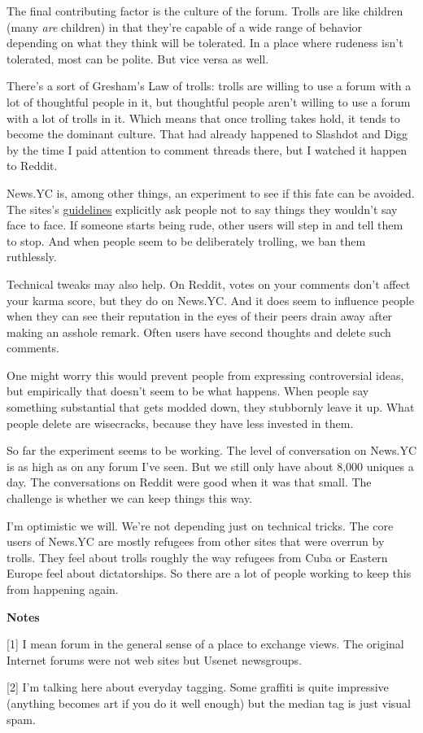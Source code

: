 The final contributing factor is the culture of the forum. Trolls are
like children (many \emph{are} children) in that they're capable of a
wide range of behavior depending on what they think will be tolerated.
In a place where rudeness isn't tolerated, most can be polite. But vice
versa as well.

There's a sort of Gresham's Law of trolls: trolls are willing to use a
forum with a lot of thoughtful people in it, but thoughtful people
aren't willing to use a forum with a lot of trolls in it. Which means
that once trolling takes hold, it tends to become the dominant culture.
That had already happened to Slashdot and Digg by the time I paid
attention to comment threads there, but I watched it happen to Reddit.

News.YC is, among other things, an experiment to see if this fate can be
avoided. The sites's
\href{http://ycombinator.com/newsguidelines.html}{guidelines} explicitly
ask people not to say things they wouldn't say face to face. If someone
starts being rude, other users will step in and tell them to stop. And
when people seem to be deliberately trolling, we ban them ruthlessly.

Technical tweaks may also help. On Reddit, votes on your comments don't
affect your karma score, but they do on News.YC. And it does seem to
influence people when they can see their reputation in the eyes of their
peers drain away after making an asshole remark. Often users have second
thoughts and delete such comments.

One might worry this would prevent people from expressing controversial
ideas, but empirically that doesn't seem to be what happens. When people
say something substantial that gets modded down, they stubbornly leave
it up. What people delete are wisecracks, because they have less
invested in them.

So far the experiment seems to be working. The level of conversation on
News.YC is as high as on any forum I've seen. But we still only have
about 8,000 uniques a day. The conversations on Reddit were good when it
was that small. The challenge is whether we can keep things this way.

I'm optimistic we will. We're not depending just on technical tricks.
The core users of News.YC are mostly refugees from other sites that were
overrun by trolls. They feel about trolls roughly the way refugees from
Cuba or Eastern Europe feel about dictatorships. So there are a lot of
people working to keep this from happening again.

\textbf{Notes}

{[}1{]} I mean forum in the general sense of a place to exchange views.
The original Internet forums were not web sites but Usenet newsgroups.

{[}2{]} I'm talking here about everyday tagging. Some graffiti is quite
impressive (anything becomes art if you do it well enough) but the
median tag is just visual spam.
